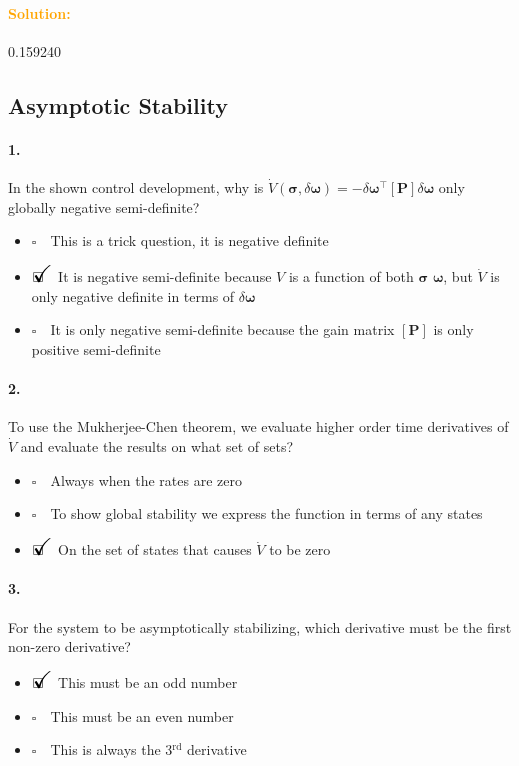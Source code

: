 \documentclass[12pt, a4paper]{article}
\newcommand{\ans}{\item[]$\rlap{\LARGE{\checkmark}}\square\quad$}
\newcommand{\noans}{\item[]$\square\quad$}
\begin{document}
\paragraph{\textcolor{orange}{Solution:}}0.159240

\newpage
\subsection{Asymptotic Stability}
\paragraph{1.}
In the shown control development, why is $\dot{V}(\bm{\sigma},\delta\bm{\omega}) = -\delta\bm{\omega}^{\intercal}[\bm{P}] \delta\bm{\omega}$ only globally negative semi-definite?

\begin{itemize}
\noans This is a trick question, it is negative definite
\ans It is negative semi-definite because $V$ is a function of both $\bm{\sigma}$ $\bm{\omega}$, but $\dot{V}$ is only negative definite in terms of $\delta\bm{\omega}$
\noans It is only negative semi-definite because the gain matrix $[\bm{P}]$ is only positive semi-definite
\end{itemize}

\paragraph{2.}
To use the Mukherjee-Chen theorem, we evaluate higher order time derivatives of $\dot{V}$ and evaluate the results on what set of sets?

\begin{itemize}
\noans Always when the rates are zero
\noans To show global stability we express the function in terms of any states
\ans On the set of states that causes $\dot{V}$ to be zero
\end{itemize}

\paragraph{3.}
For the system to be asymptotically stabilizing, which derivative must be the first non-zero derivative?

\begin{itemize}
\ans This must be an odd number
\noans This must be an even number
\noans This is always the 3$^{\text{rd}}$ derivative
\end{itemize}
\end{document}
